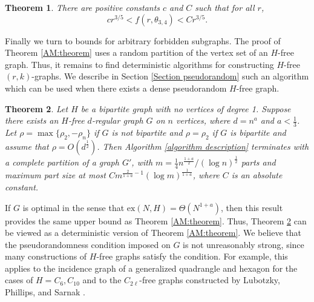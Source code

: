 \documentclass[12pt]{article}%
\newtheorem{theorem}{Theorem}[section]
\begin{document}
\begin{theorem}\label{th:theta graph}
There are positive constants $c$ and $C$ such that for all $r$, 
\[
c r^{3/5} <  f(r, \theta_{3,4}) < C  r^{3/5}.
\]
\end{theorem}

Finally we turn to bounds for arbitrary forbidden subgraphs. The proof of Theorem \ref{AM:theorem} uses a random partition of the vertex set of an $H$-free graph. Thus, it remains to find deterministic algorithms for constructing $H$-free $(r,k)$-graphs. We describe in Section \ref{Section pseudorandom} such an algorithm which can be used when there exists a dense pseudorandom $H$-free graph.

\begin{theorem} \label{algorithm works}
    Let $H$ be a bipartite graph with no vertices of degree 1. Suppose there exists an $H$-free $d$-regular graph $G$ on $n$ vertices, where $d=n^a$ and $a<\frac{1}{3}$. Let $\rho = \max\{\rho_2, -\rho_n\}$ if $G$ is not bipartite and $\rho = \rho_2$ if $G$ is bipartite and assume that $\rho=O(d^\frac{1}{2})$. Then Algorithm \ref{algorithm description} terminates with a complete partition of a graph $G'$, with $m=\frac{1}{4}n^{\frac{1+a}{2}}/(\log n)^{\frac{1}{2}}$ parts and maximum part size at most $Cm^{\frac{2}{1+a}-1}(\log m)^{\frac{1}{1+a}}$, where $C$ is an absolute constant.
\end{theorem}

If $G$ is optimal in the sense that $\mathrm{ex}(N,H)=\Theta(N^{1+a})$, then this result provides the same upper bound as Theorem \ref{AM:theorem}. Thus, Theorem \ref{algorithm works} can be viewed as a deterministic version of Theorem \ref{AM:theorem}. We believe that the pseudorandomness condition imposed on $G$ is not unreasonably strong, since many constructions of $H$-free graphs satisfy the condition. For example, this applies to the incidence graph of a generalized quadrangle and hexagon for the cases of $H=C_6, C_{10}$ and to the $C_{2\ell}$-free graphs constructed by Lubotzky, Phillips, and Sarnak \cite{LPS}.
\end{document}
